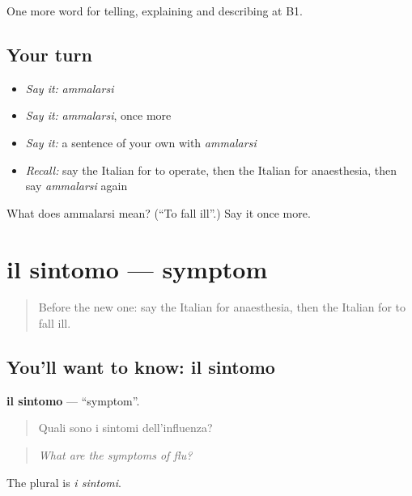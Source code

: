 \begin{grammarlens}[title={What you've built}]
One more word for telling, explaining and describing at B1.
\end{grammarlens}

\subsection*{Your turn}
\begin{itemize}
\raggedright
  \item \emph{Say it:} \emph{ammalarsi}
  \item \emph{Say it:} \emph{ammalarsi}, once more
  \item \emph{Say it:} a sentence of your own with \emph{ammalarsi}
  \item \emph{Recall:} say the Italian for to operate, then the Italian for anaesthesia, then say \emph{ammalarsi} again
\end{itemize}

\begin{tcolorbox}[breakable,colback=teal!4,colframe=teal!35!black,title={Before you move on}]
What does ammalarsi mean? (\textquotedblleft{}To fall ill\textquotedblright{}.) Say it once more.
\end{tcolorbox}
\section[il sintomo]{il sintomo — symptom}

\label{lesson:IT-C489-sintomo}



\begin{quote}
Before the new one: say the Italian for anaesthesia, then the Italian for to fall ill.
\end{quote}

\subsection*{You'll want to know: il sintomo}
\textbf{il sintomo} — \textquotedblleft{}symptom\textquotedblright{}.

\begin{quote}
Quali sono i sintomi dell'influenza?
\end{quote}

\begin{quote}
\emph{What are the symptoms of flu?}
\end{quote}

The plural is \emph{i sintomi}.

